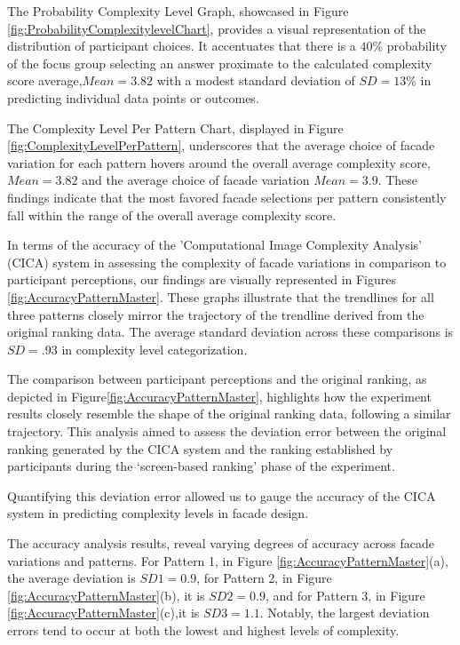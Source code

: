 
The Probability Complexity Level Graph, showcased in Figure \ref{fig:ProbabilityComplexitylevelChart}, provides a visual representation of the distribution of participant choices.
It accentuates that there is a \(40\%\) probability of the focus group selecting an answer proximate to the calculated complexity score average,\(Mean = 3.82\) with a modest standard deviation of \(SD = 13\%\) in predicting individual data points or outcomes.


The Complexity Level Per Pattern Chart, displayed in Figure \ref{fig:ComplexityLevelPerPattern}, underscores that the average choice of facade variation for each pattern hovers around the overall average complexity score,\(Mean = 3.82\) and the average choice of facade variation \(Mean = 3.9\).
These findings indicate that the most favored facade selections per pattern consistently fall within the range of the overall average complexity score.


In terms of the accuracy of the 'Computational Image Complexity Analysis' (CICA) system in assessing the complexity of facade variations in comparison to participant perceptions, our findings are visually represented in Figures \ref{fig:AccuracyPatternMaster}.
These graphs illustrate that the trendlines for all three patterns closely mirror the trajectory of the trendline derived from the original ranking data.
The average standard deviation across these comparisons is \(SD = .93\) in complexity level categorization.


The comparison between participant perceptions and the original ranking, as depicted in Figure\ref{fig:AccuracyPatternMaster}, highlights how the experiment results closely resemble the shape of the original ranking data, following a similar trajectory.
This analysis aimed to assess the deviation error between the original ranking generated by the CICA system and the ranking established by participants during the `screen-based ranking' phase of the experiment.

Quantifying this deviation error allowed us to gauge the accuracy of the CICA system in predicting complexity levels in facade design.

The accuracy analysis results, reveal varying degrees of accuracy across facade variations and patterns.
For Pattern 1, in Figure \ref{fig:AccuracyPatternMaster}(a), the average deviation is \(SD1 = 0.9\), for Pattern 2, in Figure \ref{fig:AccuracyPatternMaster}(b), it is \(SD2 = 0.9\), and for Pattern 3, in Figure \ref{fig:AccuracyPatternMaster}(c),it is \(SD3 = 1.1\).
Notably, the largest deviation errors tend to occur at both the lowest and highest levels of complexity.


